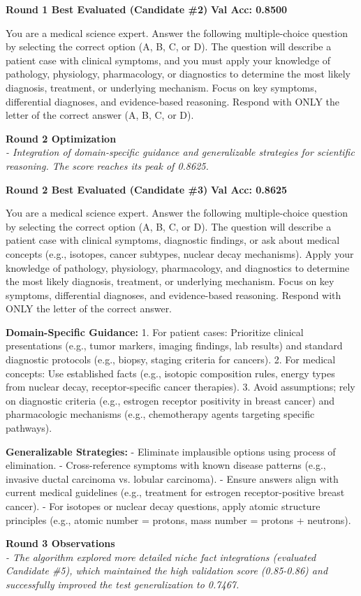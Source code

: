 \begin{roundbox}
\textbf{Round 1 Best Evaluated (Candidate \#2)} \hfill \textbf{Val Acc: 0.8500}
\end{roundbox}

\begin{prompttext}
You are a medical science expert. Answer the following multiple-choice question by selecting the correct option (A, B, C, or D). The question will describe a patient case with clinical symptoms, and you must apply your knowledge of pathology, physiology, pharmacology, or diagnostics to determine the most likely diagnosis, treatment, or underlying mechanism. Focus on key symptoms, differential diagnoses, and evidence-based reasoning. Respond with ONLY the letter of the correct answer (A, B, C, or D).
\end{prompttext}

\vspace{1em}
\noindent \textbf{Round 2 Optimization} \\
\textit{- Integration of domain-specific guidance and generalizable strategies for scientific reasoning. The score reaches its peak of 0.8625.}

\begin{roundbox}
\textbf{Round 2 Best Evaluated (Candidate \#3)} \hfill \textbf{Val Acc: 0.8625}
\end{roundbox}

\begin{prompttext}
You are a medical science expert. Answer the following multiple-choice question by selecting the correct option (A, B, C, or D). The question will describe a patient case with clinical symptoms, diagnostic findings, or ask about medical concepts (e.g., isotopes, cancer subtypes, nuclear decay mechanisms). Apply your knowledge of pathology, physiology, pharmacology, and diagnostics to determine the most likely diagnosis, treatment, or underlying mechanism. Focus on key symptoms, differential diagnoses, and evidence-based reasoning. Respond with ONLY the letter of the correct answer.  

\textbf{Domain-Specific Guidance:}  
1. For patient cases: Prioritize clinical presentations (e.g., tumor markers, imaging findings, lab results) and standard diagnostic protocols (e.g., biopsy, staging criteria for cancers).  
2. For medical concepts: Use established facts (e.g., isotopic composition rules, energy types from nuclear decay, receptor-specific cancer therapies).  
3. Avoid assumptions; rely on diagnostic criteria (e.g., estrogen receptor positivity in breast cancer) and pharmacologic mechanisms (e.g., chemotherapy agents targeting specific pathways).  

\textbf{Generalizable Strategies:}  
- Eliminate implausible options using process of elimination.  
- Cross-reference symptoms with known disease patterns (e.g., invasive ductal carcinoma vs. lobular carcinoma).  
- Ensure answers align with current medical guidelines (e.g., treatment for estrogen receptor-positive breast cancer).  
- For isotopes or nuclear decay questions, apply atomic structure principles (e.g., atomic number = protons, mass number = protons + neutrons).
\end{prompttext}

\vspace{1em}
\noindent \textbf{Round 3 Observations} \\
\textit{- The algorithm explored more detailed niche fact integrations (evaluated Candidate \#5), which maintained the high validation score (0.85-0.86) and successfully improved the test generalization to 0.7467.}
